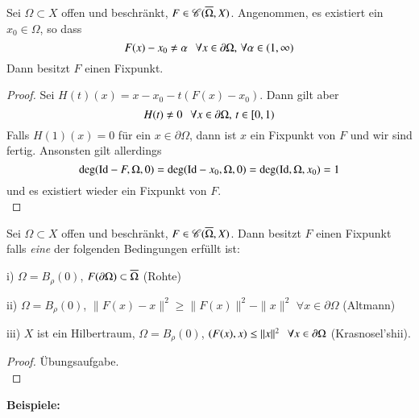 \begin{theorem}\label{3.14}
    Sei $\Omega\subset X$ offen und beschränkt, $F\in \mathscr C(\overline\Omega,X)$. Angenommen, es existiert ein
    $x_0\in \Omega$, so dass
    \[
        F(x)-x_0\neq \alpha \hspace{.25cm} \forall x\in \partial \Omega, \, \forall \alpha\in(1,\infty)
    \]
    Dann besitzt $F$ einen Fixpunkt.
\end{theorem}

\begin{proof}
    Sei $H(t)(x)=x-x_0-t(F(x)-x_0)$. Dann gilt aber
    \[
        H(t)\neq 0 \hspace{.25cm} \forall x \in \partial\Omega, \, t\in [0,1)
    \]
    Falls $H(1)(x)=0$ für ein $x\in \partial \Omega$, dann ist $x$ ein Fixpunkt von $F$ und wir
    sind fertig. Ansonsten gilt allerdings
    \[
        \deg(\mathrm{Id}-F,\Omega,0)=\deg(\mathrm{Id}-x_0,\Omega,0)=\deg(\mathrm{Id},\Omega,x_0)=1
    \]
    und es existiert wieder ein Fixpunkt von $F$. 
    \[ \]
\end{proof}

\begin{cor}\label{3.15}
    Sei $\Omega\subset X$ offen und beschränkt, $F\in \mathscr C (\overline \Omega, X)$. Dann besitzt $F$ einen
    Fixpunkt falls \textit{eine} der folgenden Bedingungen erfüllt ist:
    \begin{description}
        \item{i)}
        $\Omega=B_\rho(0)$, $F(\partial \Omega)\subset \overline\Omega$ (Rohte)
        \item{ii)}
        $\Omega=B_\rho(0)$, $\|F(x)-x\|^2\geq \|F(x)\|^2-\|x\|^2$ $\forall x\in \partial \Omega$
        (Altmann)
        \item{iii)}
        $X$ ist ein Hilbertraum, $\Omega=B_\rho(0)$, $(F(x),x)\leq \|x\|^2 \hspace{.25cm} \forall x 
        \in \partial \Omega$ (Krasnosel'shii).
    \end{description}
\end{cor}

\begin{proof}
    Übungsaufgabe. \[ \]
\end{proof}

\noindent \textbf{Beispiele:}

